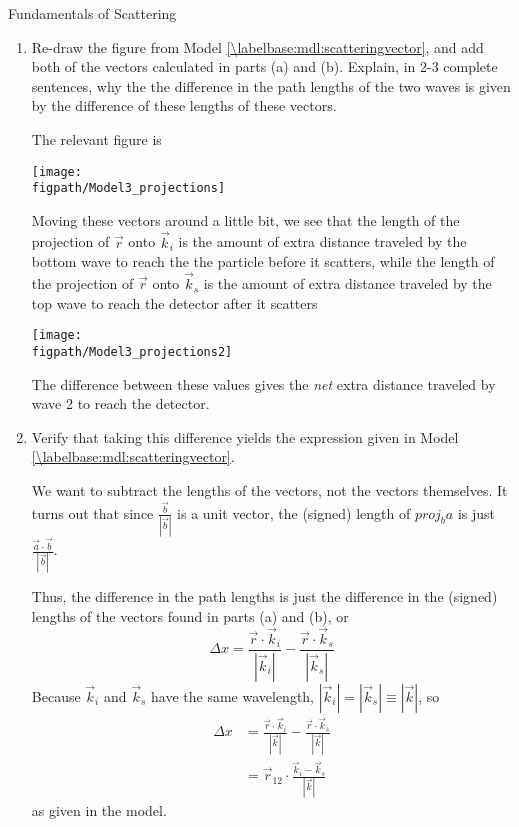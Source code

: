 \begin{activity}{Fundamentals of Scattering}
\begin{exercises}
\begin{enumerate}
			\item Re-draw the figure from Model \ref{\labelbase:mdl:scatteringvector}, and add both of the vectors calculated in parts (a) and (b).  Explain, in 2-3 complete sentences, why the the difference in the path lengths of the two waves is given by the difference of these lengths of these vectors.
			
				\begin{solution}{}
					The relevant figure is
					
					\centerline{\texttt{[image: \\figpath/Model3\_projections]}}
					
					Moving these vectors around a little bit, we see that the length of the projection of $\vec r$ onto $\vec k_i$ is the amount of extra distance traveled by the bottom wave to reach the the particle before it scatters, while the length of the projection of $\vec r$ onto $\vec k_s$ is the amount of extra distance traveled by the top wave to reach the detector after it scatters
					
					\centerline{\texttt{[image: \\figpath/Model3\_projections2]}}
					
					The difference between these values gives the \emph{net} extra distance traveled by wave 2 to reach the detector.
					
				\end{solution}
			
			
			\item Verify that taking this difference yields the expression given in Model \ref{\labelbase:mdl:scatteringvector}.
			
				\begin{solution}{}
				
					We want to subtract the lengths of the vectors, not the vectors themselves.  It turns out that since $\frac{\vec b}{|\vec b|}$ is a unit vector, the (signed) length of $proj_b a$ is just $\frac{\vec a \cdot \vec b}{|\vec b|}$.
					
					Thus, the difference in the path lengths is just the difference in the (signed) lengths of the vectors found in parts (a) and (b), or
					\begin{equation*}
						\Delta x = \frac{\vec r \cdot \vec k_i}{|\vec k_i|} - \frac{\vec r \cdot \vec k_s}{|\vec k_s|}
					\end{equation*}
					Because $\vec k_i$ and $\vec k_s$ have the same wavelength, $|\vec k_i| = |\vec k_s| \equiv |\vec k|$, so
					\begin{align*}
						\Delta x &= \frac{\vec r \cdot \vec k_i}{|\vec k|} - \frac{\vec r \cdot \vec k_s}{|\vec k|}\\
							&= \vec r_{12} \cdot \frac{\vec k_i - \vec k_s}{|\vec k|}
					\end{align*}
					as given in the model.
					

\end{solution}
\end{enumerate}
\end{exercises}
\end{activity}
